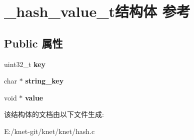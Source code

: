 \hypertarget{struct__hash__value__t}{}\section{\+\_\+hash\+\_\+value\+\_\+t结构体 参考}
\label{struct__hash__value__t}
\subsection*{Public 属性}
\begin{DoxyCompactItemize}
\item 
\hypertarget{struct__hash__value__t_a7159c9891911dc975ebf4134db49e82b}{}uint32\+\_\+t {\bfseries key}\label{struct__hash__value__t_a7159c9891911dc975ebf4134db49e82b}

\item 
\hypertarget{struct__hash__value__t_a4bf4b998778e8dbda180743cc4da375a}{}char $\ast$ {\bfseries string\+\_\+key}\label{struct__hash__value__t_a4bf4b998778e8dbda180743cc4da375a}

\item 
\hypertarget{struct__hash__value__t_a2137cdf6c18ab110ebe2a6b0edce5017}{}void $\ast$ {\bfseries value}\label{struct__hash__value__t_a2137cdf6c18ab110ebe2a6b0edce5017}

\end{DoxyCompactItemize}


该结构体的文档由以下文件生成\+:\begin{DoxyCompactItemize}
\item 
E\+:/knet-\/git/knet/knet/hash.\+c\end{DoxyCompactItemize}
